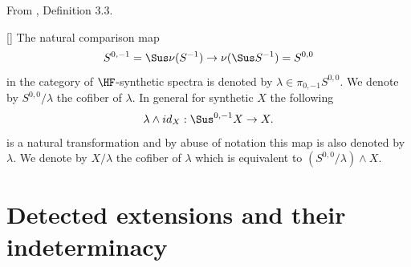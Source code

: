 \begin{definition}
\label{paper:3.3}
From \cite{LWX126}, Definition 3.3.\par
[{\cite[Definition 4.27]{Pst}}]
    The natural comparison map
    $$S^{0,-1}=\Sus \nu (S^{-1})\to \nu(\Sus S^{-1})=S^{0,0}$$
    in the category of $\HF$-synthetic spectra is denoted by $\lambda\in \pi_{0,-1}S^{0,0}$. We denote by $S^{0,0}/\lambda$ the cofiber of $\lambda$. In general for synthetic $X$ the following
    $$\lambda\wedge id_X: \Sus^{0,-1}X\to X.$$
    is a natural transformation and by abuse of notation this map is also denoted by $\lambda$.
    We denote by $X/\lambda$ the cofiber of $\lambda$
    which is equivalent to $(S^{0,0}/\lambda) \wedge X$.




\sketch
\end{definition}

\section{Detected extensions and their indeterminacy}

